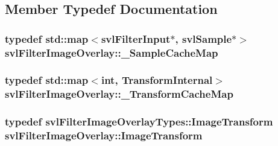 \subsection{Member Typedef Documentation}
\hypertarget{classsvl_filter_image_overlay_a0cb98a1b14141d0a0940656ebec8d3ea}{
\subsubsection[{\-\_\-\-Sample\-Cache\-Map}]{\setlength{\rightskip}{0pt plus 5cm}typedef std\-::map$<${\bf svl\-Filter\-Input}$\ast$, {\bf svl\-Sample}$\ast$$>$ {\bf svl\-Filter\-Image\-Overlay\-::\-\_\-\-Sample\-Cache\-Map}\hspace{0.3cm}{\ttfamily [protected]}}}\label{classsvl_filter_image_overlay_a0cb98a1b14141d0a0940656ebec8d3ea}
\hypertarget{classsvl_filter_image_overlay_ae7f68bdaad7a6718f5d38e99099fd1a4}{
\subsubsection[{\-\_\-\-Transform\-Cache\-Map}]{\setlength{\rightskip}{0pt plus 5cm}typedef std\-::map$<$int, {\bf Transform\-Internal}$>$ {\bf svl\-Filter\-Image\-Overlay\-::\-\_\-\-Transform\-Cache\-Map}\hspace{0.3cm}{\ttfamily [protected]}}}\label{classsvl_filter_image_overlay_ae7f68bdaad7a6718f5d38e99099fd1a4}
\hypertarget{classsvl_filter_image_overlay_a68354a171b2498de3aa1c5ba0ff2f002}{
\subsubsection[{Image\-Transform}]{\setlength{\rightskip}{0pt plus 5cm}typedef {\bf svl\-Filter\-Image\-Overlay\-Types\-::\-Image\-Transform} {\bf svl\-Filter\-Image\-Overlay\-::\-Image\-Transform}}}\label{classsvl_filter_image_overlay_a68354a171b2498de3aa1c5ba0ff2f002}
